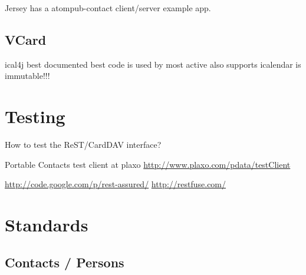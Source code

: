 \documentclass[12pt,a4paper]{scrartcl}		%
\begin{document}

Jersey has a atompub-contact client/server example app.

\subsection{VCard}



ical4j 
best documented
best code
is used by 
most active
also supports icalendar
is immutable!!!

\section{Testing}
How to test the ReST/CardDAV interface?


Portable Contacts test client at plaxo \url{http://www.plaxo.com/pdata/testClient}

\url{http://code.google.com/p/rest-assured/} \url{http://restfuse.com/}

\appendix

\section{Standards}
\subsection{Contacts / Persons}

\end{document}
